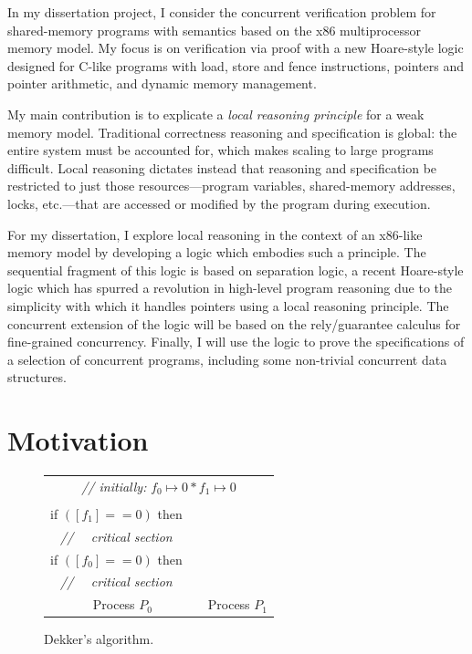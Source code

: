 \documentclass[11pt]{report}
\begin{document}
In my dissertation project, I consider the concurrent verification problem for shared-memory programs with semantics based on the x86 multiprocessor memory model. My focus is on verification via proof with a new Hoare-style logic designed for C-like programs with load, store and fence instructions, pointers and pointer arithmetic, and dynamic memory management.

My main contribution is to explicate a \emph{local reasoning principle} for a weak memory model. Traditional correctness reasoning and specification is global: the entire system must be accounted for, which makes scaling to large programs difficult. Local reasoning dictates instead that reasoning and specification be restricted to just those resources---program variables, shared-memory addresses, locks, etc.---that are accessed or modified by the program during execution.

For my dissertation, I explore local reasoning in the context of an x86-like memory model by developing a logic which embodies such a principle. The sequential fragment of this logic is based on separation logic, a recent Hoare-style logic which has spurred a revolution in high-level program reasoning due to the simplicity with which it handles pointers using a local reasoning principle. The concurrent extension of the logic will be based on the rely/guarantee calculus for fine-grained concurrency. Finally, I will use the logic to prove the specifications of a selection of concurrent programs, including some non-trivial concurrent data structures.


\section{Motivation}

\begin{figure}[h]
\centering
\begin{tabular}{cc||cc}
  \multicolumn{4}{c}{\textit{// initially:} $f_0 \mapsto 0 * f_1 \mapsto
  0$}\vspace{0.5em}\\

  \begin{minipage}{0.25\textwidth}
    $\left[f_0\right] := 1;$ \\
    if $(\left[f_1\right] == 0)$ then\\
    \textit{// ~~critical section}
  \end{minipage} & \hspace{0.5cm} & \hspace{0.5cm} &
  \begin{minipage}{0.25\textwidth}
    $\left[f_1\right] := 1;$ \\
    if $(\left[f_0\right] == 0)$ then\\
    \textit{// ~~critical section}
  \end{minipage}\vspace{1em}\\
  \multicolumn{2}{c}{Process $P_0$} & \multicolumn{2}{c}{Process
  $P_1$}\\
\end{tabular}
\caption{\label{fig:dekker} Dekker's algorithm.}
\end{figure}
\end{document}
